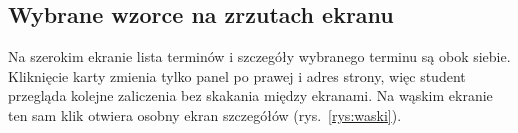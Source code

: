 \subsection{Wybrane wzorce na zrzutach ekranu}\label{sec:wzorce-zrzuty}
Na szerokim ekranie lista terminów i szczegóły wybranego terminu są obok siebie. Kliknięcie karty
zmienia tylko panel po prawej i adres strony, więc student przegląda kolejne zaliczenia bez skakania
między ekranami. Na wąskim ekranie ten sam klik otwiera osobny ekran szczegółów (rys.~\ref{rys:waski}).
